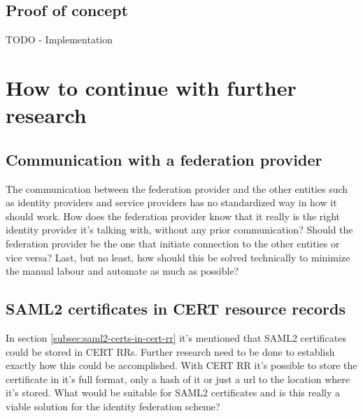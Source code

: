 \subsection{Proof of concept}
TODO - Implementation




\section{How to continue with further research}
\subsection{Communication with a federation provider}
The communication between the federation provider and the other entities such as identity providers and service providers has no standardized way in how it should work.
How does the federation provider know that it really is the right identity provider it's talking with, without any prior communication?
Should the federation provider be the one that initiate connection to the other entities or vice versa?
Last, but no least, how should this be solved technically to minimize the manual labour and automate as much as possible?

\subsection{SAML2 certificates in CERT resource records}
In section \ref{subsec:saml2-certs-in-cert-rr} it's mentioned that SAML2 certificates could be stored in CERT RRs.
Further research need to be done to establish exactly how this could be accomplished.
With CERT RR it's possible to store the certificate in it's full format, only a hash of it or just a url to the location where it's stored\cite[ch. 2.1]{rfc:4398}.
What would be suitable for SAML2 certificates and is this really a viable solution for the identity federation scheme?

